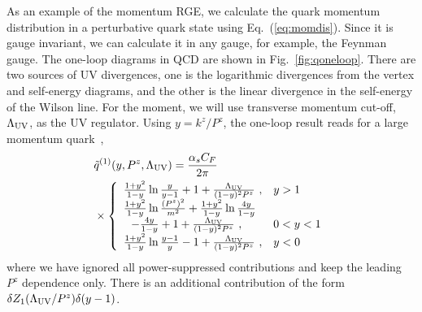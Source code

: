 \documentclass[aps,rmp,reprint,amsmath,amssymb,graphicx,longbibliography]{revtex4-1} %
\begin{document}
As an example of the momentum RGE,
we calculate the quark momentum distribution
in a perturbative quark state using Eq.~(\ref{eq:momdis}).
Since it is gauge invariant, we can calculate it
in any gauge, for example, the Feynman gauge. The one-loop diagrams in QCD are shown in Fig.~\ref{fig:qoneloop}. There are two sources of UV
divergences, one is the logarithmic divergences from the vertex and self-energy diagrams, and the other
is the linear divergence in the self-energy of the Wilson line.
For the moment, we will use transverse momentum cut-off, $\Lambda_{\rm UV}$,  as the
UV regulator.  Using $y=k^z/P^z$, the one-loop result reads
for a large momentum quark~\cite{Xiong:2013bka},
\begin{align}\label{unpolvertex}
	& \tilde q^{(1)}(y,P^z,\Lambda_{\rm UV})=\frac{\alpha_s C_F}{2\pi} \nonumber
	\\
	& \times \left\{ \begin{array} {ll} \frac{1+y^2}{1-y}\ln \frac{y}{y-1}+1
		+\frac{\Lambda_{\rm UV}}{(1-y)^2P^z}\ , & y>1 \\
		\frac{1+y^2}{1-y}\ln \frac{(P^z)^2}{m^2}+\frac{1+y^2}{1-y}\ln\frac{4y}{1-y} \\
		\, \, \, \, -\frac{4y}{1-y}+1+\frac{\Lambda_{\rm UV}}{(1-y)^2P^z}\ , & 0<y<1 \\ \frac{1+y^2}{1-y}\ln \frac{y-1}{y}-1+\frac{\Lambda_{\rm UV}}{(1-y)^2P^z}\ , & y<0 \end{array} \right.
\end{align}
where we have ignored all power-suppressed contributions and keep the leading $P^z$ dependence only.
There is an additional contribution of the form $\delta Z_1(\Lambda_{\rm UV}/P^z) \delta(y-1)$.
\end{document}
